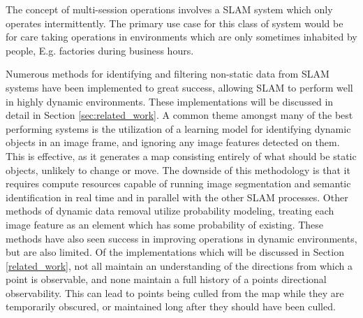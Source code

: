 
The concept of multi-session operations involves a SLAM system which only operates intermittently. The primary use case for this class of system would be for care taking operations in environments which are only sometimes inhabited by people, E.g. factories during business hours.

Numerous methods for identifying and filtering non-static data from SLAM systems have been implemented to great success, allowing SLAM to perform well in highly dynamic environments. These implementations will be discussed in detail in Section \ref{sec:related_work}. A common theme amongst many of the best performing systems is the utilization of a learning model for identifying dynamic objects in an image frame, and ignoring any image features detected on them. This is effective, as it generates a map consisting entirely of what should be static objects, unlikely to change or move. The downside of this methodology is that it requires compute resources capable of running image segmentation and semantic identification in real time and in parallel with the other SLAM processes. Other methods of dynamic data removal utilize probability modeling, treating each image feature as an element which has some probability of existing. These methods have also seen success in improving operations in dynamic environments, but are also limited. Of the implementations which will be discussed in Section \ref{related_work}, not all maintain an understanding of the directions from which a point is observable, and none maintain a full history of a points directional observability. This can lead to points being culled from the map while they are temporarily obscured, or maintained long after they should have been culled.
